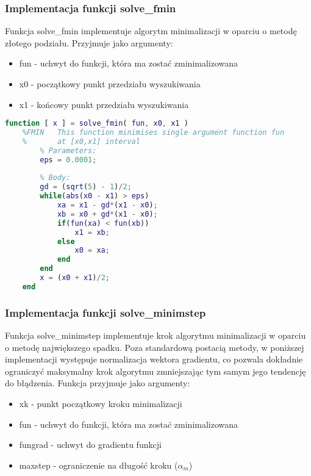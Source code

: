 \documentclass[12pt]{article}
\begin{document}
\subsubsection*{Implementacja funkcji solve\_fmin}

Funkcja solve\_fmin implementuje algorytm minimalizacji w oparciu o metodę
złotego podziału. Przyjmuje jako argumenty:

\begin{itemize}
  \item fun - uchwyt do funkcji, która ma zostać zminimalizowana
  \item x0 - początkowy punkt przedziału wyszukiwania
  \item x1 - końcowy punkt przedziału wyszukiwania
\end{itemize}

\begin{lstlisting}[language=MATLAB, style=mystyle]
    function [ x ] = solve_fmin( fun, x0, x1 )
    %FMIN   This function minimises single argument function fun
    %       at [x0,x1] interval
        % Parameters:
        eps = 0.0001;
        
        % Body:
        gd = (sqrt(5) - 1)/2;
        while(abs(x0 - x1) > eps)
            xa = x1 - gd*(x1 - x0);
            xb = x0 + gd*(x1 - x0);
            if(fun(xa) < fun(xb))
                x1 = xb;
            else
                x0 = xa;
            end
        end
        x = (x0 + x1)/2;
    end
\end{lstlisting}

\newpage

\subsubsection*{Implementacja funkcji solve\_minimstep}

Funkcja solve\_minimstep implementuje krok algorytmu minimalizacji w oparciu o
metodę największego spadku. Poza standardową postacią metody, w poniższej
implementacji występuje normalizacja wektora gradientu, co pozwala dokładnie
ograniczyć maksymalny krok algorytmu zmniejszając tym samym jego tendencję
do błądzenia. Funkcja przyjmuje jako argumenty:

\begin{itemize}
  \item xk - punkt początkowy kroku minimalizacji
  \item fun - uchwyt do funkcji, która ma zostać zminimalizowana
  \item fungrad - uchwyt do gradientu funkcji
  \item maxstep - ograniczenie na długość kroku ($\alpha_{m}$)
\end{itemize}
\end{document}
